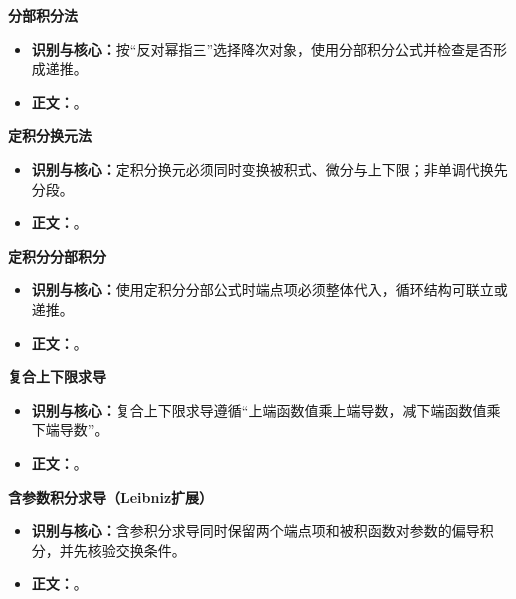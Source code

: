 \begin{knowledgeBox}
\textbf{分部积分法}

\begin{itemize}
  \item \textbf{识别与核心：}按“反对幂指三”选择降次对象，使用分部积分公式并检查是否形成递推。
  \item \textbf{正文：}。
\end{itemize}

\textbf{定积分换元法}

\begin{itemize}
  \item \textbf{识别与核心：}定积分换元必须同时变换被积式、微分与上下限；非单调代换先分段。
  \item \textbf{正文：}。
\end{itemize}

\textbf{定积分分部积分}

\begin{itemize}
  \item \textbf{识别与核心：}使用定积分分部公式时端点项必须整体代入，循环结构可联立或递推。
  \item \textbf{正文：}。
\end{itemize}

\textbf{复合上下限求导}

\begin{itemize}
  \item \textbf{识别与核心：}复合上下限求导遵循“上端函数值乘上端导数，减下端函数值乘下端导数”。
  \item \textbf{正文：}。
\end{itemize}

\textbf{含参数积分求导（Leibniz扩展）}

\begin{itemize}
  \item \textbf{识别与核心：}含参积分求导同时保留两个端点项和被积函数对参数的偏导积分，并先核验交换条件。
  \item \textbf{正文：}。
\end{itemize}


\end{knowledgeBox}
